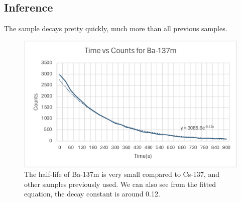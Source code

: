 \documentclass[twocolumn]{article}
\begin{document}
\subsection*{Inference}
The sample decays pretty quickly, much more than all previous samples.
\begin{center}
\begin{figure}[h!]
\includegraphics[scale=0.055]{lab13_b.png}
\caption{\small{The half-life of Ba-137m is very small compared to Cs-137, and other samples previously used. We can also see from the fitted equation, the decay constant is around 0.12. }}
\end{figure}


\end{center}
\end{document}
